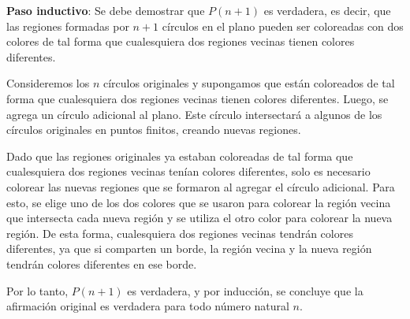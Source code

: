 \documentclass{article}
\begin{document}
  \textbf{Paso inductivo}: Se debe demostrar que $P(n+1)$ es verdadera, es decir, que las regiones formadas por $n+1$ círculos en el plano 
  pueden ser coloreadas con dos colores de tal forma que cualesquiera dos regiones vecinas tienen colores diferentes.

  Consideremos los $n$ círculos originales y supongamos que están coloreados de tal forma que cualesquiera dos regiones vecinas tienen 
  colores diferentes. Luego, se agrega un círculo adicional al plano. Este círculo intersectará a algunos de los círculos originales en 
  puntos finitos, creando nuevas regiones.

  Dado que las regiones originales ya estaban coloreadas de tal forma que cualesquiera dos regiones vecinas tenían colores diferentes, 
  solo es necesario colorear las nuevas regiones que se formaron al agregar el círculo adicional. Para esto, se elige uno de los dos colores 
  que se usaron para colorear la región vecina que intersecta cada nueva región y se utiliza el otro color para colorear la nueva región. 
  De esta forma, cualesquiera dos regiones vecinas tendrán colores diferentes, ya que si comparten un borde, la región vecina y la nueva región 
  tendrán colores diferentes en ese borde.

  Por lo tanto, $P(n+1)$ es verdadera, y por inducción, se concluye que la afirmación original es verdadera para todo número natural $n$.
\end{document}
